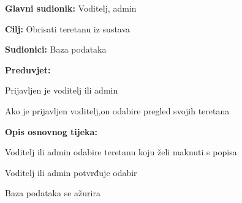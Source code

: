 				\noindent {}
				\begin{packed_item}
					
					\item \textbf{Glavni sudionik: } Voditelj, admin
					\item  \textbf{Cilj:} Obrisati teretanu iz sustava
					\item  \textbf{Sudionici:} Baza podataka
					\item  \textbf{Preduvjet:}
					\item[] \begin{packed_enum}
						
						\item Prijavljen je voditelj ili admin
						\item Ako je prijavljen voditelj,on odabire pregled svojih teretana
						
					\end{packed_enum}
					\item  \textbf{Opis osnovnog tijeka:}
					
					\item[] \begin{packed_enum}
						
						\item Voditelj ili admin odabire teretanu koju želi maknuti s popisa
						
						\item Voditelj ili admin potvrđuje odabir
						
						\item Baza podataka se ažurira
					\end{packed_enum}
					
				\end{packed_item}
				
